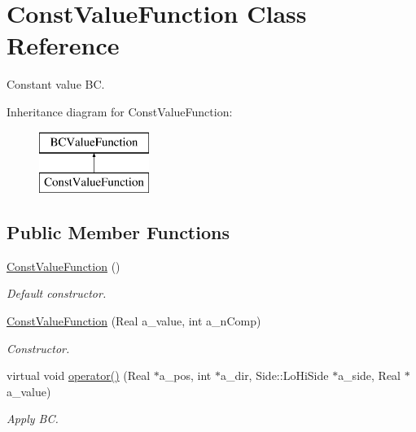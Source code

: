 \hypertarget{class_const_value_function}{\section{Const\-Value\-Function Class Reference}
\label{class_const_value_function}
}


Constant value B\-C.  


Inheritance diagram for Const\-Value\-Function\-:\begin{figure}[H]
\begin{center}
\leavevmode
\includegraphics[height=2.000000cm]{class_const_value_function}
\end{center}
\end{figure}
\subsection*{Public Member Functions}
\begin{DoxyCompactItemize}
\item 
\hypertarget{class_const_value_function_a3022feb84ef9e65bba61c2fe27a3bcd3}{\hyperlink{class_const_value_function_a3022feb84ef9e65bba61c2fe27a3bcd3}{Const\-Value\-Function} ()}\label{class_const_value_function_a3022feb84ef9e65bba61c2fe27a3bcd3}

\begin{DoxyCompactList}\small\item\em Default constructor. \end{DoxyCompactList}\item 
\hypertarget{class_const_value_function_a2c0a36991ee9548815186ac1db46d133}{\hyperlink{class_const_value_function_a2c0a36991ee9548815186ac1db46d133}{Const\-Value\-Function} (Real a\-\_\-value, int a\-\_\-n\-Comp)}\label{class_const_value_function_a2c0a36991ee9548815186ac1db46d133}

\begin{DoxyCompactList}\small\item\em Constructor. \end{DoxyCompactList}\item 
\hypertarget{class_const_value_function_a417fb6f37a91828d252e433b3992e585}{virtual void \hyperlink{class_const_value_function_a417fb6f37a91828d252e433b3992e585}{operator()} (Real $\ast$a\-\_\-pos, int $\ast$a\-\_\-dir, Side\-::\-Lo\-Hi\-Side $\ast$a\-\_\-side, Real $\ast$a\-\_\-value)}\label{class_const_value_function_a417fb6f37a91828d252e433b3992e585}

\begin{DoxyCompactList}\small\item\em Apply B\-C. \end{DoxyCompactList}\end{DoxyCompactItemize}
